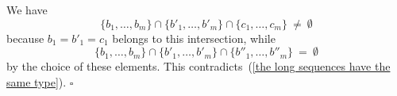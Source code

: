 \documentclass[11pt, twoside]{amsart}
\numberwithin{equation}{section}
\newcommand{\es}{\emptyset}
\begin{document}
We have
\[ \{b_1, \ldots, b_m\} \cap \{b'_1, \ldots, b'_m\} \cap \{c_1, \ldots, c_m\} \ \neq \ \es \]
because $b_1 = b'_1 = c_1$ belongs to this intersection, while
\[ \{b_1, \ldots, b_m\} \cap \{b'_1, \ldots, b'_m\} \cap \{b''_1, \ldots, b''_m\} \ = \ \es \]
by the choice of these elements.
This contradicts~(\ref{the long sequences have the same type}).
\hfill $\square$
\end{document}
